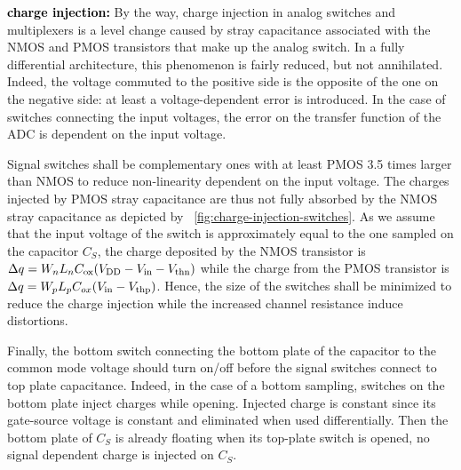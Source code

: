 \textbf{\textcolor{black}{charge injection:}}
By the way, charge injection in analog switches and multiplexers is a level change caused by stray capacitance associated with the NMOS and PMOS transistors that make up the analog switch. In a fully differential architecture, this phenomenon is fairly reduced, but not annihilated. Indeed, the voltage commuted to the positive side is the opposite of the one on the negative side: at least a voltage-dependent error is introduced. In the case of switches connecting the input voltages, the error on the transfer function of the ADC is dependent on the input voltage.

Signal switches shall be complementary ones with at least PMOS 3.5 times larger than NMOS to reduce non-linearity dependent on the input voltage. The charges injected by PMOS stray capacitance are thus not fully absorbed by the NMOS stray capacitance as depicted by \figurename~\ref{fig:charge-injection-switches}. As we assume that the input voltage of the switch is approximately equal to the one sampled on the capacitor \(C_S\), the charge deposited by the NMOS transistor is \(\Delta q = W_nL_nC_{\rm ox}(V_{\rm DD}-V_{\rm in}-V_{\rm thn}) \) while the charge from the PMOS transistor is \(\Delta q = W_pL_pC_{ox}(V_{\rm in}-V_{\rm thp}) \). Hence, the size of the switches shall be minimized to reduce the charge injection while the increased channel resistance induce distortions.

Finally, the bottom switch connecting the bottom plate of the capacitor to the common mode voltage should turn on/off before the signal switches connect to top plate capacitance. Indeed, in the case of a bottom sampling, switches on the bottom plate inject charges while opening. Injected charge is constant since its gate-source voltage is constant and eliminated when used differentially. Then the bottom plate of \(C_S\) is already floating when its top-plate switch is opened, no signal dependent charge is injected on \(C_S\).

